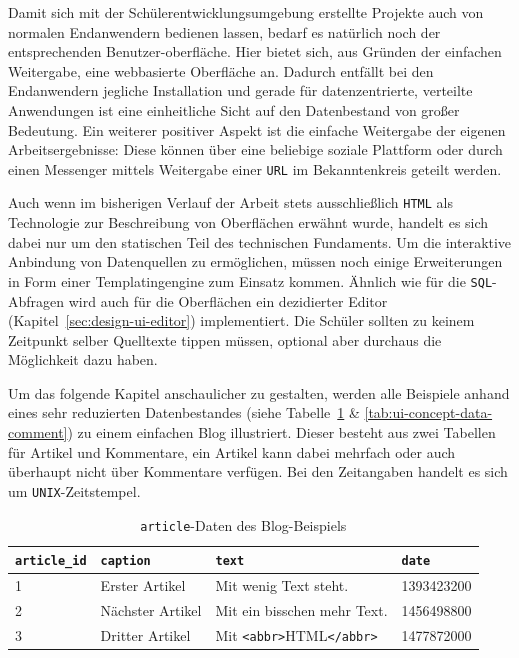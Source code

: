 Damit sich mit der Schülerentwicklungsumgebung erstellte Projekte auch von normalen Endanwendern bedienen lassen, bedarf es natürlich noch der entsprechenden Benutzer-oberfläche. Hier bietet sich, aus Gründen der einfachen Weitergabe, eine webbasierte Oberfläche an. Dadurch entfällt bei den Endanwendern jegliche Installation und gerade für datenzentrierte, verteilte Anwendungen ist eine einheitliche Sicht auf den Datenbestand von großer Bedeutung. Ein weiterer positiver Aspekt ist die einfache Weitergabe der eigenen Arbeitsergebnisse: Diese können über eine beliebige soziale Plattform oder durch einen Messenger mittels Weitergabe einer \texttt{URL} im Bekanntenkreis geteilt werden.


Auch wenn im bisherigen Verlauf der Arbeit stets ausschließlich \texttt{HTML} als Technologie zur Beschreibung von Oberflächen erwähnt wurde, handelt es sich dabei nur um den statischen Teil des technischen Fundaments. Um die interaktive Anbindung von Datenquellen zu ermöglichen, müssen noch einige Erweiterungen in Form einer Templatingengine zum Einsatz kommen. Ähnlich wie für die \texttt{SQL}-Abfragen wird auch für die Oberflächen ein dezidierter Editor (Kapitel~\ref{sec:design-ui-editor}) implementiert. Die Schüler sollten zu keinem Zeitpunkt selber Quelltexte tippen müssen, optional aber durchaus die Möglichkeit dazu haben.

Um das folgende Kapitel anschaulicher zu gestalten, werden alle Beispiele anhand eines sehr reduzierten Datenbestandes (siehe Tabelle~\ref{tab:ui-concept-data-article} \& \ref{tab:ui-concept-data-comment}) zu einem einfachen Blog illustriert. Dieser besteht aus zwei Tabellen für Artikel und Kommentare, ein Artikel kann dabei mehrfach oder auch überhaupt nicht über Kommentare verfügen. Bei den Zeitangaben handelt es sich um \texttt{UNIX}-Zeitstempel.

\begin{table}[h]
  \centering
  \begin{tabularx}{\linewidth}{ l l X l }
    \texttt{article\_id}&\texttt{caption}&\texttt{text}&\texttt{date}\\
    \hline
    1&Erster Artikel&Mit wenig Text steht.&1393423200\\
    2&Nächster Artikel&Mit ein bisschen mehr Text.&1456498800\\
    3&Dritter Artikel&Mit \texttt{<abbr>}HTML\texttt{</abbr>}&1477872000\\
  \end{tabularx}
  \caption{\texttt{article}-Daten des Blog-Beispiels}
  \label{tab:ui-concept-data-article}
\end{table}

